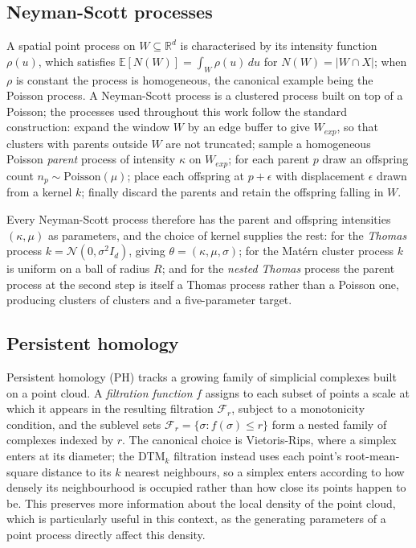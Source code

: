 \documentclass[11pt,a4paper]{article}
\newcommand{\R}{\mathbb{R}}
\newcommand{\E}{\mathbb{E}}
\newcommand{\filt}{\mathcal{F}}
\begin{document}
\subsection{Neyman-Scott processes}
\label{ssec:spp}

A spatial point process on $W \subseteq \R^d$ is characterised by its intensity
function $\rho(u)$, which satisfies $\E[N(W)] = \int_W \rho(u)\,du$ for
$N(W) = |W \cap X|$; when $\rho$ is constant the process is homogeneous, the
canonical example being the Poisson process. A Neyman-Scott process is a
clustered process built on top of a Poisson; the processes used throughout this work follow the standard construction: expand the window $W$ by an edge buffer to give $W_{exp}$, so that
clusters with parents outside $W$ are not truncated; sample a homogeneous
Poisson \emph{parent} process of intensity $\kappa$ on $W_{exp}$; for each
parent $p$ draw an offspring count $n_p \sim \mathrm{Poisson}(\mu)$; place each
offspring at $p + \epsilon$ with displacement $\epsilon$ drawn from a kernel
$k$; finally discard the parents and retain the offspring falling in $W$.

Every Neyman-Scott process therefore has the parent and offspring intensities
$(\kappa,\mu)$ as parameters, and the choice of kernel supplies the rest: for
the \emph{Thomas} process $k = \mathcal{N}(0,\sigma^2 I_d)$, giving
$\theta = (\kappa,\mu,\sigma)$; for the Mat\'ern cluster process $k$ is uniform
on a ball of radius $R$; and for the \emph{nested Thomas} process the parent
process at the second step is itself a Thomas process rather than a Poisson one,
producing clusters of clusters and a five-parameter target.

\subsection{Persistent homology}
\label{ssec:persistence}
Persistent homology (PH)  tracks a growing family of simplicial complexes built on a point cloud. A
\emph{filtration function} $f$ assigns to each subset of points a scale at
which it appears in the resulting filtration $\filt_r$, subject to a monotonicity condition, and the sublevel sets
$\filt_r = \{\sigma : f(\sigma)\le r\}$ form a nested family of complexes
indexed by $r$. The canonical choice is Vietoris-Rips, where a simplex enters at
its diameter; the DTM$_k$ filtration \citep{anai2020dtm} instead uses each
point's root-mean-square distance to its $k$ nearest neighbours, so a simplex
enters according to how densely its neighbourhood is occupied rather than how
close its points happen to be. This preserves more information about the local density of the point cloud, which is particularly useful in this context, as the generating parameters of a point process directly affect this density.
\end{document}
